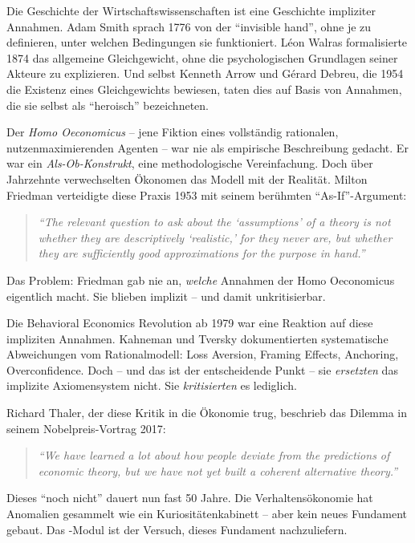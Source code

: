 Die Geschichte der Wirtschaftswissenschaften ist eine Geschichte impliziter Annahmen. Adam Smith sprach 1776 von der ``invisible hand'', ohne je zu definieren, unter welchen Bedingungen sie funktioniert. Léon Walras formalisierte 1874 das allgemeine Gleichgewicht, ohne die psychologischen Grundlagen seiner Akteure zu explizieren. Und selbst Kenneth Arrow und Gérard Debreu, die 1954 die Existenz eines Gleichgewichts bewiesen, taten dies auf Basis von Annahmen, die sie selbst als ``heroisch'' bezeichneten.

Der \textit{Homo Oeconomicus} -- jene Fiktion eines vollständig rationalen, nutzenmaximierenden Agenten -- war nie als empirische Beschreibung gedacht. Er war ein \textit{Als-Ob-Konstrukt}, eine methodologische Vereinfachung. Doch über Jahrzehnte verwechselten Ökonomen das Modell mit der Realität. Milton Friedman verteidigte diese Praxis 1953 mit seinem berühmten ``As-If''-Argument:

\begin{quote}
\textit{``The relevant question to ask about the `assumptions' of a theory is not whether they are descriptively `realistic,' for they never are, but whether they are sufficiently good approximations for the purpose in hand.''}
\end{quote}

Das Problem: Friedman gab nie an, \textit{welche} Annahmen der Homo Oeconomicus eigentlich macht. Sie blieben implizit -- und damit unkritisierbar.

Die Behavioral Economics Revolution ab 1979 war eine Reaktion auf diese impliziten Annahmen. Kahneman und Tversky dokumentierten systematische Abweichungen vom Rationalmodell: Loss Aversion, Framing Effects, Anchoring, Overconfidence. Doch -- und das ist der entscheidende Punkt -- sie \textit{ersetzten} das implizite Axiomensystem nicht. Sie \textit{kritisierten} es lediglich.

Richard Thaler, der diese Kritik in die Ökonomie trug, beschrieb das Dilemma in seinem Nobelpreis-Vortrag 2017:

\begin{quote}
\textit{``We have learned a lot about how people deviate from the predictions of economic theory, but we have not yet built a coherent alternative theory.''}
\end{quote}

Dieses ``noch nicht'' dauert nun fast 50 Jahre. Die Verhaltensökonomie hat Anomalien gesammelt wie ein Kuriositätenkabinett -- aber kein neues Fundament gebaut. Das \META-Modul ist der Versuch, dieses Fundament nachzuliefern.

